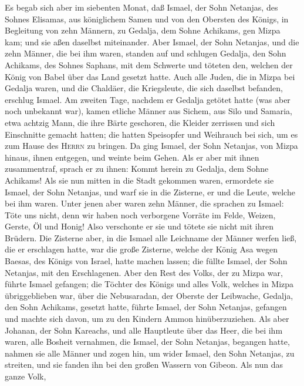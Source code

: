  Es begab sich aber im siebenten Monat, daß Ismael, der
Sohn Netanjas, des Sohnes Elisamas, aus königlichem Samen und von den
Obersten des Königs, in Begleitung von zehn Männern, zu Gedalja, dem
Sohne Achikams, gen Mizpa kam; und sie aßen daselbst miteinander.
 Aber Ismael, der Sohn Netanjas, und die zehn Männer, die
bei ihm waren, standen auf und schlugen Gedalja, den Sohn Achikams, des
Sohnes Saphans, mit dem Schwerte und töteten den, welchen der König von
Babel über das Land gesetzt hatte.  Auch alle Juden, die
in Mizpa bei Gedalja waren, und die Chaldäer, die Kriegsleute, die sich
daselbst befanden, erschlug Ismael.  Am zweiten Tage,
nachdem er Gedalja getötet hatte (was aber noch unbekannt war),
 kamen etliche Männer aus Sichem, aus Silo und Samaria,
etwa achtzig Mann, die ihre Bärte geschoren, die Kleider zerrissen und
sich Einschnitte gemacht hatten; die hatten Speisopfer und Weihrauch bei
sich, um es zum Hause des \textsc{Herrn} zu bringen.  Da
ging Ismael, der Sohn Netanjas, von Mizpa hinaus, ihnen entgegen, und
weinte beim Gehen. Als er aber mit ihnen zusammentraf, sprach er zu
ihnen: Kommt herein zu Gedalja, dem Sohne Achikams!  Als
sie nun mitten in die Stadt gekommen waren, ermordete sie Ismael, der
Sohn Netanjas, und warf sie in die Zisterne, er und die Leute, welche
bei ihm waren.  Unter jenen aber waren zehn Männer, die
sprachen zu Ismael: Töte uns nicht, denn wir haben noch verborgene
Vorräte im Felde, Weizen, Gerste, Öl und Honig! Also verschonte er sie
und tötete sie nicht mit ihren Brüdern.  Die Zisterne
aber, in die Ismael alle Leichname der Männer werfen ließ, die er
erschlagen hatte, war die große Zisterne, welche der König Asa wegen
Baesas, des Königs von Israel, hatte machen lassen; die füllte Ismael,
der Sohn Netanjas, mit den Erschlagenen.  Aber den Rest
des Volks, der zu Mizpa war, führte Ismael gefangen; die Töchter des
Königs und alles Volk, welches in Mizpa übriggeblieben war, über die
Nebusaradan, der Oberste der Leibwache, Gedalja, den Sohn Achikams,
gesetzt hatte, führte Ismael, der Sohn Netanjas, gefangen und machte
sich davon, um zu den Kindern Ammon hinüberzuziehen.  Als
aber Johanan, der Sohn Kareachs, und alle Hauptleute über das Heer, die
bei ihm waren, alle Bosheit vernahmen, die Ismael, der Sohn Netanjas,
begangen hatte,  nahmen sie alle Männer und zogen hin, um
wider Ismael, den Sohn Netanjas, zu streiten, und sie fanden ihn bei den
großen Wassern von Gibeon.  Als nun das ganze Volk,
